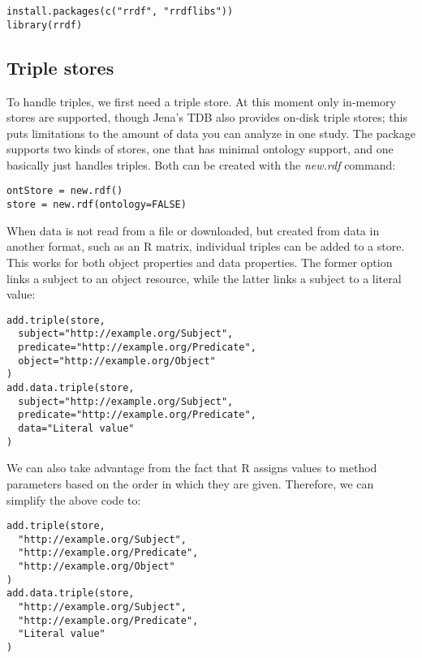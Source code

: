 \documentclass[12pt]{article}
\begin{document}
\begin{footnotesize}
\begin{verbatim}
install.packages(c("rrdf", "rrdflibs"))
library(rrdf)
\end{verbatim}
\end{footnotesize}

\subsection{Triple stores}

To handle triples, we first need a triple store. At this moment only in-memory stores are
supported, though Jena's TDB also provides on-disk triple stores; this puts limitations to
the amount of data you can analyze in one study.
The package supports two kinds of stores, one that has minimal ontology support, and one
basically just handles triples. Both can be created with the \textit{new.rdf} command:

\begin{footnotesize}
\begin{verbatim}
ontStore = new.rdf()
store = new.rdf(ontology=FALSE)
\end{verbatim}
\end{footnotesize}

When data is not read from a file or downloaded, but created from data in another format,
such as an R matrix, individual triples can be added to a store. This works for both
object properties and data properties. The former option links a subject to an object
resource, while the latter links a subject to a literal value:

\begin{footnotesize}
\begin{verbatim}
add.triple(store,
  subject="http://example.org/Subject",
  predicate="http://example.org/Predicate",
  object="http://example.org/Object"
)
add.data.triple(store,
  subject="http://example.org/Subject",
  predicate="http://example.org/Predicate",
  data="Literal value"
)
\end{verbatim}
\end{footnotesize}

We can also take advantage from the fact that R assigns values to method parameters based on
the order in which they are given. Therefore, we can simplify the above code to:

\begin{footnotesize}
\begin{verbatim}
add.triple(store,
  "http://example.org/Subject",
  "http://example.org/Predicate",
  "http://example.org/Object"
)
add.data.triple(store,
  "http://example.org/Subject",
  "http://example.org/Predicate",
  "Literal value"
)
\end{verbatim}
\end{footnotesize}
\end{document}
